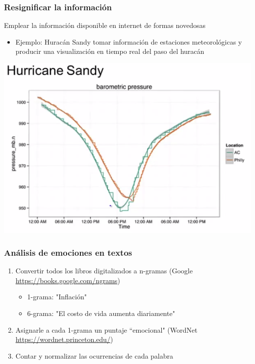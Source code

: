 \documentclass{beamer}
\begin{document}
\begin{frame}

\frametitle{Resignificar la informaci\'on}

	Emplear la informaci\'on disponible en internet de formas novedosas
	
\begin{itemize}
	\item Ejemplo: Hurac\'an Sandy tomar informaci\'on de estaciones
	meteorol\'ogicas y producir una visualizaci\'on en tiempo real del
	paso del hurac\'an
\end{itemize}

\includegraphics[scale=.4]{img/huracan.png}

\end{frame}

\begin{frame}

\frametitle{An\'alisis de emociones en textos}
\begin{enumerate}%
	\item Convertir todos los libros digitalizados a n-gramas (Google \\
	\href{url}{https://books.google.com/ngrams})
	\begin{itemize}
		\item 1-grama: "Inflaci\'on"
		\item 6-grama: "El costo de vida aumenta diariamente"
	\end{itemize}
	\item Asignarle a cada 1-grama un puntaje ``emocional" (WordNet \\
	\href{url}{https://wordnet.princeton.edu/})
	\item Contar y normalizar las ocurrencias de cada palabra
\end{enumerate}

\end{frame}
\end{document}
